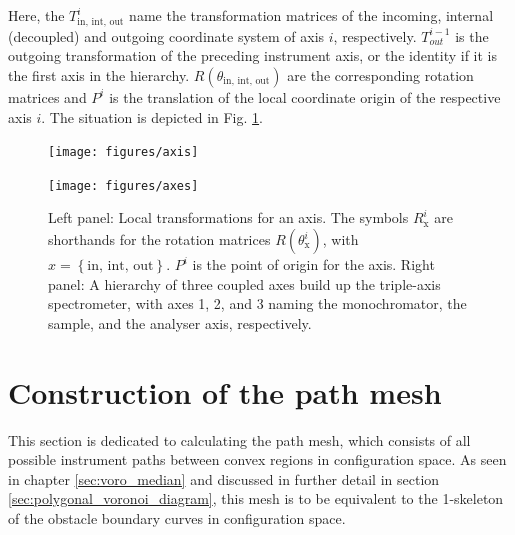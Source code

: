 Here, the $T_{\mathrm{in,\, int,\, out}}^{i}$ name the transformation matrices of the incoming, internal (decoupled) 
and outgoing coordinate system of axis $i$, respectively.
$T_{out}^{i-1}$ is the outgoing transformation of the preceding instrument axis, or the identity if it is the first axis 
in the hierarchy.
$R\left(\theta_{\mathrm{in,\, int,\, out}}\right)$ are the corresponding rotation matrices and $P^i$ is the translation
of the local coordinate origin of the respective axis $i$.
The situation is depicted in Fig. \ref{fig:tas_axes}.


\begin{figure}
	\begin{minipage}{0.45 \textwidth}
		\begin{center}
			\texttt{[image: figures/axis]}
		\end{center}
	\end{minipage}
	\begin{minipage}{0.45 \textwidth}
		\begin{center}
			\texttt{[image: figures/axes]}
		\end{center}
	\end{minipage}
	\caption[Instrument axis coordinate systems.]{
	Left panel: Local transformations for an axis. The symbols $R_{\mathrm{x}}^i$ are shorthands
	for the rotation matrices $R\left( \theta_{\mathrm{x}}^i \right)$, with $x = \left\{ \mathrm{in,\, int,\, out} \right\}$.
	$P^i$ is the point of origin for the axis.
	Right panel: A hierarchy of three coupled axes build up the triple-axis spectrometer, with axes 1, 2, and 3 
	naming the monochromator, the sample, and the analyser axis, respectively.
	\label{fig:tas_axes}}
\end{figure}






\section{Construction of the path mesh}
\label{sec:buildpath}
This section is dedicated to calculating the path mesh, which consists of all possible instrument paths between
convex regions in configuration space. As seen in chapter \ref{sec:voro_median} and discussed in further detail
in section \ref{sec:polygonal_voronoi_diagram}, this mesh is to be equivalent to the 1-skeleton of the obstacle
boundary curves in configuration space.

